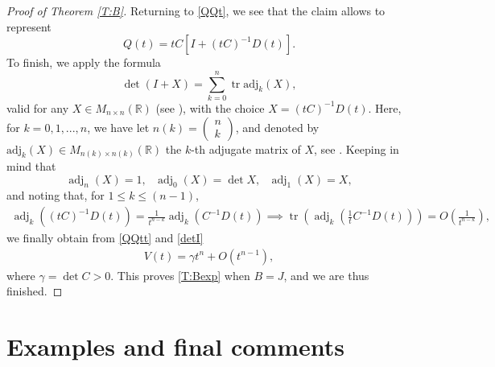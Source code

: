 \documentclass[11pt,letter]{amsart}
\def \R {\mathbb{R}}
\numberwithin{equation}{section}
\newcommand{\tr}{\operatorname{tr}}
\numberwithin{equation}{section}
\begin{document}
\begin{proof}[Proof of Theorem \ref{T:B}]
Returning to \eqref{QQt}, we see that the claim allows to represent
\begin{equation}\label{QQtt}
Q(t) = t C \left[I + (tC)^{-1} D(t)\right].
\end{equation}
To finish, we apply the formula 
\begin{equation}\label{detI}
\det(I+X) = \sum_{k=0}^n \tr \text{adj}_k(X),
\end{equation}
valid for any $X\in M_{n\times n}(\R)$ (see \cite[p. 29]{HJ}), with the choice $X= (tC)^{-1} D(t)$. Here, for $k=0,1,...,n$, we have let $n(k) = \begin{pmatrix} n \\ k\end{pmatrix}$, and denoted by $\text{adj}_k(X)\in M_{n(k)\times n(k)}(\R)$ the  $k$-th adjugate matrix of $X$, see \cite[(0.8.12.1)]{HJ}. Keeping in mind that 
\[
\operatorname{adj}_n(X) = 1,\ \ \ \operatorname{adj}_0(X) = \det X,\ \ \  \operatorname{adj}_1(X) = X,
\]
and noting that, for $1\le k \le (n-1)$,
\begin{align*}
\operatorname{adj}_{k}((tC)^{-1}D(t))=\frac{1}{t^{n-k}}\operatorname{adj}_{k}(C^{-1}D(t)) \implies \tr(\operatorname{adj}_{k}(\frac{1}{t}C^{-1}D(t)))=O(\frac{1}{t^{n-k}}), 
\end{align*}
we finally obtain from \eqref{QQtt} and \eqref{detI}
\begin{align*}
V(t)=\gamma t^{n}+ O(t^{n-1}),
\end{align*}
where $\gamma = \det C>0$. This proves \eqref{T:Bexp} when $B = J$, and we are thus finished.

\end{proof}







	











\vskip 0.2in



\section{Examples and final comments}\label{S:example} 
\end{document}
